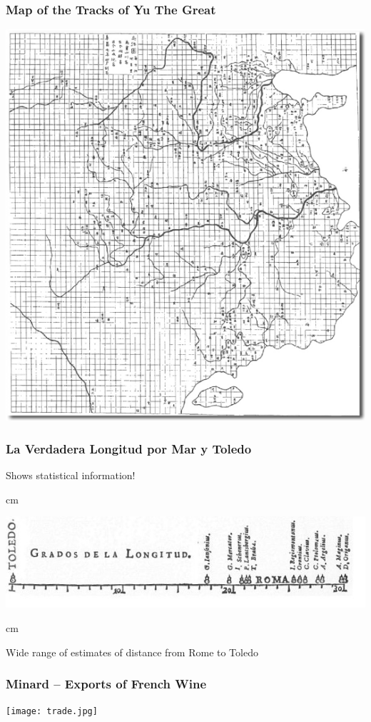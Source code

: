 \documentclass{beamer} %
\begin{document}
\begin{frame}\frametitle{Map of the Tracks of Yu The Great}
	\centering
	\includegraphics[width=0.7\linewidth]{yu.png}
\end{frame}




\begin{frame}\frametitle{La Verdadera Longitud por Mar y Toledo}
	\centering
	Shows statistical information!
	
	 cm
	
	\includegraphics[width=\linewidth]{longitud.jpg}
	
	 cm
	
	Wide range of estimates of distance from Rome to Toledo
\end{frame}



\begin{frame}\frametitle{Minard -- Exports of French Wine}
	\centering
	\texttt{[image: trade.jpg]}
\end{frame}
\end{document}
